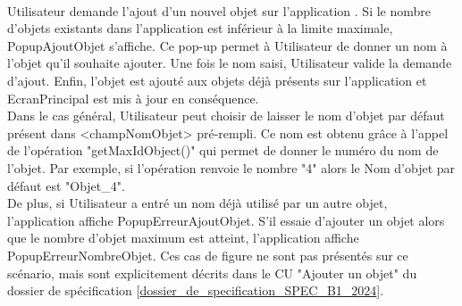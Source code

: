 \\
Utilisateur demande l'ajout d'un nouvel objet sur l'application {\nomApplication}. Si le nombre d'objets existants dans l'application {\nomApplication} est inférieur à la limite maximale, PopupAjoutObjet s'affiche. Ce pop-up permet à Utilisateur de donner un nom à l'objet qu'il souhaite ajouter. Une fois le nom saisi, Utilisateur valide la demande d'ajout. Enfin, l'objet est ajouté aux objets déjà présents sur l'application {\nomApplication} et EcranPrincipal est mis à jour en conséquence. \\
Dans le cas général, Utilisateur peut choisir de laisser le nom d'objet par défaut présent dans <champNomObjet> pré-rempli. Ce nom est obtenu grâce à l'appel de l'opération "getMaxIdObject()" qui permet de donner le numéro du nom de l'objet. Par exemple, si l'opération renvoie le nombre "4" alors le Nom d'objet par défaut est "Objet\_4".\\
De plus, si Utilisateur a entré un nom déjà utilisé par un autre objet, l'application {\nomApplication} affiche PopupErreurAjoutObjet. S'il essaie d'ajouter un objet alors que le nombre d'objet maximum est atteint, l'application {\nomApplication} affiche PopupErreurNombreObjet. Ces cas de figure ne sont pas présentés sur ce scénario, mais sont explicitement décrits dans le CU "Ajouter un objet" du dossier de spécification [\hyperref[SPEC]{dossier\_de\_specification\_SPEC\_B1\_2024}].
